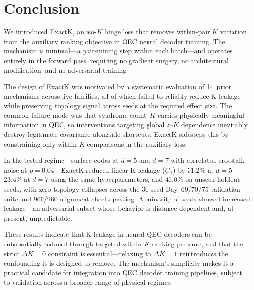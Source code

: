 
\section{Conclusion}

We introduced ExactK, an iso-$K$ hinge loss that removes within-pair $K$ variation from the auxiliary ranking objective in QEC neural decoder training. The mechanism is minimal---a pair-mining step within each batch---and operates entirely in the forward pass, requiring no gradient surgery, no architectural modification, and no adversarial training.

The design of ExactK was motivated by a systematic evaluation of 14~prior mechanisms across five families, all of which failed to reliably reduce K-leakage while preserving topology signal across seeds at the required effect size. The common failure mode was that syndrome count~$K$ carries physically meaningful information in QEC, so interventions targeting global $z$--$K$ dependence inevitably destroy legitimate covariance alongside shortcuts. ExactK sidesteps this by constraining only within-$K$ comparisons in the auxiliary loss.

In the tested regime---surface codes at $d{=}5$ and $d{=}7$ with correlated crosstalk noise at $p{=}0.04$---ExactK reduced linear K-leakage ($G_1$) by $31.2\%$ at $d{=}5$, $23.4\%$ at $d{=}7$ using the same hyperparameters, and $45.0\%$ on unseen holdout seeds, with zero topology collapses across the 30-seed Day~69/70/75 validation suite and 960/960 alignment checks passing. A minority of seeds showed increased leakage---an adversarial subset whose behavior is distance-dependent and, at present, unpredictable.

These results indicate that K-leakage in neural QEC decoders can be substantially reduced through targeted within-$K$ ranking pressure, and that the strict $\Delta K{=}0$ constraint is essential---relaxing to $\Delta K{=}1$ reintroduces the confounding it is designed to remove. The mechanism's simplicity makes it a practical candidate for integration into QEC decoder training pipelines, subject to validation across a broader range of physical regimes.
